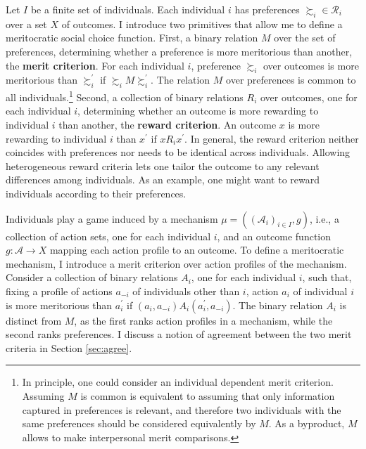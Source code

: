 Let \(I \) be a finite set of individuals. Each individual \( i \) has preferences \( \succsim_i \in \mathcal{R}_i \) over a set \( X \) of outcomes. I introduce two primitives that allow me to define a meritocratic social choice function. First, a binary relation \( M \) over the set of preferences, determining whether a preference is more meritorious than another, the \textbf{merit criterion}. For each individual \( i \), preference \( \succsim_i \) over outcomes is more meritorious than \( \succsim_i^{\prime} \) if \( \succsim_i M \succsim_i^{\prime} \). The relation \( M \) over preferences is common to all individuals.\footnote{In principle, one could consider an individual dependent merit criterion. Assuming \( M \) is common is equivalent to assuming that only information captured in preferences is relevant, and therefore two individuals with the same preferences should be considered equivalently by \( M \). As a byproduct, \( M \) allows to make interpersonal merit comparisons.} Second, a collection of binary relations \( R_{i} \) over outcomes, one for each individual \( i \), determining whether an outcome is more rewarding to individual \( i \) than another, the \textbf{reward criterion}. An outcome \( x \) is more rewarding to individual \( i \) than \( x^{\prime} \) if \( x R_{i} x^{\prime} \). In general, the reward criterion neither coincides with preferences nor needs to be identical across individuals. Allowing heterogeneous reward criteria lets one tailor the outcome to any relevant differences among individuals. As an example, one might want to reward individuals according to their preferences.

Individuals play a game induced by a mechanism \( \mu = ( ( \mathcal{A}_i )_{i \in I}, g ) \), i.e., a collection of action sets, one for each individual \( i \), and an outcome function  \( g \colon \mathcal{A} \rightarrow X \) mapping each action profile to an outcome. To define a meritocratic mechanism, I introduce a merit criterion over action profiles of the mechanism. Consider a collection of binary relations \( A_i \), one for each individual \( i \), such that, fixing a profile of actions \( a_{-i} \) of individuals other than \( i \), action \( a_i \) of individual \( i \) is more meritorious than \( a_i^{\prime} \) if \( ( a_i, a_{-i} ) A_i ( a_i^{\prime}, a_{-i} ) \). The binary relation \( A_i \) is distinct from \( M \), as the first ranks action profiles in a mechanism, while the second ranks preferences. I discuss a notion of agreement between the two merit criteria in Section \ref{sec:agree}.

